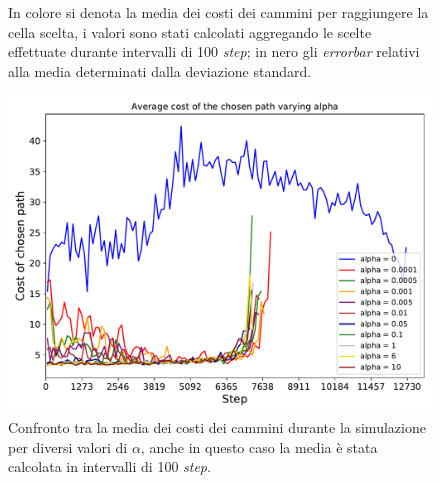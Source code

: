 \begin{figure}
\begin{tabular}{cc}
	\end{tabular}
	\caption{In colore si denota la media dei costi dei cammini per raggiungere la cella scelta, i valori sono stati calcolati aggregando le scelte effettuate durante intervalli di 100 \textit{step}; in nero gli \textit{errorbar} relativi alla media determinati dalla deviazione standard.}
	\label{fig:alphaOverTime}
\end{figure}

\begin{figure}
	\centering
	\includegraphics[width=0.9\linewidth]{images/alpha_results/comparison}
	\caption{Confronto tra la media dei costi dei cammini durante la simulazione per diversi valori di $\alpha$, anche in questo caso la media è stata calcolata in intervalli di 100 \textit{step}.}
	\label{fig:alphaComparison}
\end{figure}
\clearpage